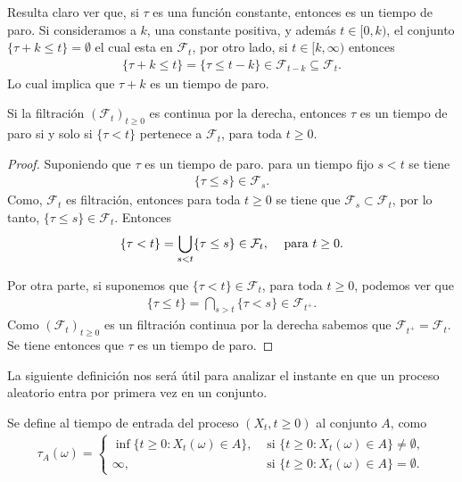 Resulta claro ver que, si $\tau$ es una función constante, entonces es un tiempo de paro. Si consideramos a $k$, una constante positiva, y además $t \in [0, k)$, el conjunto $\{\tau + k \leq t\} = \emptyset$ el cual esta en $\mathcal{F}_t$, por otro lado, si $t \in [k, \infty)$ entonces
\begin{align*}
\{ \tau + k \leq t \} = \{ \tau \leq t - k \} \in \mathcal{F}_{t-k} \subseteq \mathcal{F}_{t}.
\end{align*}
Lo cual implica que $\tau + k$ es un tiempo de paro.

\begin{proposition}
	\label{paroequivalente}
	Si la filtración $(\mathcal{F}_t)_{t \geq 0}$ es continua por la derecha, entonces $\tau$ es un tiempo de paro si y solo si $\{\tau < t\}$ pertenece a $\mathcal{F}_t$, para toda $t \geq 0$.
\end{proposition}
\begin{proof}
	Suponiendo que $\tau$ es un tiempo de paro. para un tiempo fijo $s < t$ se tiene
	\begin{align*}
	\{ \tau \leq s \} \in \mathcal{F}_s.
	\end{align*}
	Como, $\mathcal{F}_t$ es filtración, entonces para toda $t \geq 0$ se tiene que $\mathcal{F}_s \subset \mathcal{F}_t$, por lo tanto, $\{ \tau \leq s \} \in \mathcal{F}_t$. Entonces 
	\begin{align*}
	\{ \tau < t \} = \bigcup_{s < t} \{ \tau \leq s \} \in \mathcal{F}_t, \hspace{0.3cm} \text{ para } t \geq 0.
	\end{align*}
	
	Por otra parte, si suponemos que $\{ \tau < t \} \in \mathcal{F}_t$, para toda $t \geq 0$, podemos ver que 
	\begin{align*}
	\{\tau \leq t \} = \bigcap_{s > t} \{\tau < s\} \in \mathcal{F}_{t^{+}}.
	\end{align*}
	Como $(\mathcal{F}_t)_{t \geq 0}$ es un filtración continua por la derecha sabemos que $\mathcal{F}_{t^{+}} = \mathcal{F}_t$. Se tiene entonces que $\tau$ es un tiempo de paro.
\end{proof}

La siguiente definición nos será útil para analizar el instante en que un proceso aleatorio entra por primera vez en un conjunto. 
\begin{definition}
	Se define al tiempo de entrada del proceso $(X_t, t \geq 0)$ al conjunto $A$, como
	\begin{align*}
	\tau_A (\omega) = 
	\begin{cases}
	\inf \{ t \geq 0 : X_t (\omega) \in A \}, & \text{ si } \{ t \geq 0 : X_t (\omega) \in A \} \neq \emptyset, \\
	\infty, & \text{ si } \{ t \geq 0 : X_t (\omega) \in A \} = \emptyset.
	\end{cases}
	\end{align*}
\end{definition}

